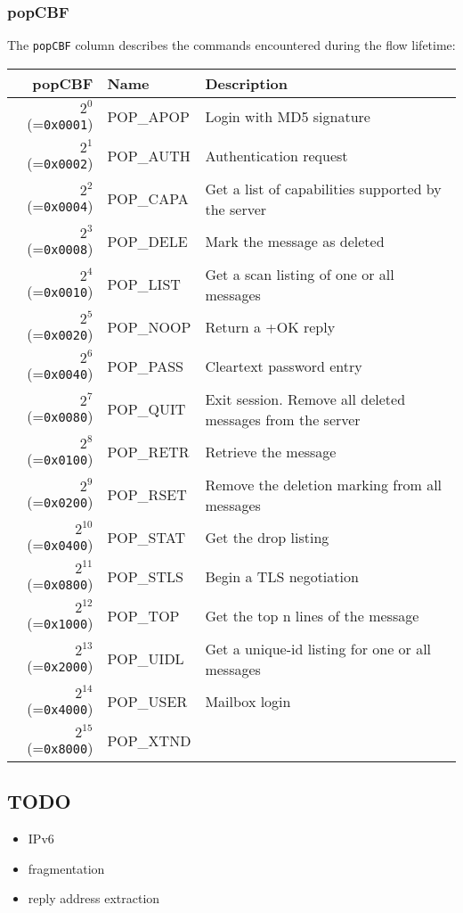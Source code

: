 \documentclass[documentation]{subfiles}
\begin{document}
\subsubsection{popCBF}\label{popCBF}
The {\tt popCBF} column describes the commands encountered during the flow lifetime:
\begin{longtable}{rll}
    \toprule
    {\bf popCBF} & {\bf Name} & {\bf Description} \\
    \midrule\endhead%
    $2^{0}$  (={\tt 0x0001}) & POP\_APOP & Login with MD5 signature \\
    $2^{1}$  (={\tt 0x0002}) & POP\_AUTH & Authentication request \\
    $2^{2}$  (={\tt 0x0004}) & POP\_CAPA & Get a list of capabilities supported by the server \\
    $2^{3}$  (={\tt 0x0008}) & POP\_DELE & Mark the message as deleted \\
    $2^{4}$  (={\tt 0x0010}) & POP\_LIST & Get a scan listing of one or all messages \\
    $2^{5}$  (={\tt 0x0020}) & POP\_NOOP & Return a +OK reply \\
    $2^{6}$  (={\tt 0x0040}) & POP\_PASS & Cleartext password entry \\
    $2^{7}$  (={\tt 0x0080}) & POP\_QUIT & Exit session. Remove all deleted messages from the server \\
    $2^{8}$  (={\tt 0x0100}) & POP\_RETR & Retrieve the message \\
    $2^{9}$  (={\tt 0x0200}) & POP\_RSET & Remove the deletion marking from all messages \\
    $2^{10}$ (={\tt 0x0400}) & POP\_STAT & Get the drop listing \\
    $2^{11}$ (={\tt 0x0800}) & POP\_STLS & Begin a TLS negotiation \\
    $2^{12}$ (={\tt 0x1000}) & POP\_TOP &  Get the top n lines of the message \\
    $2^{13}$ (={\tt 0x2000}) & POP\_UIDL & Get a unique-id listing for one or all messages \\
    $2^{14}$ (={\tt 0x4000}) & POP\_USER & Mailbox login \\
    $2^{15}$ (={\tt 0x8000}) & POP\_XTND &  \\
    \bottomrule
\end{longtable}

\subsection{TODO}

\begin{itemize}
    \item IPv6
    \item fragmentation
    \item reply address extraction
\end{itemize}
\end{document}
